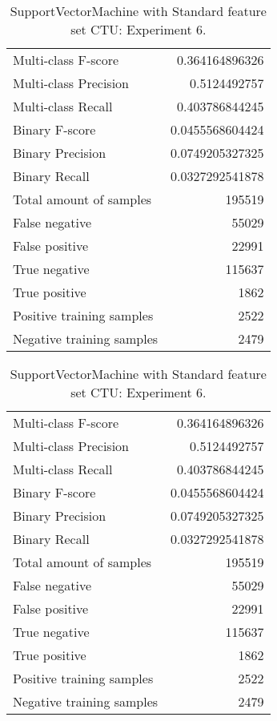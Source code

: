 \begin{table}[H]
\begin{minipage}{0.5\textwidth}
\caption{SupportVectorMachine with Standard feature set CTU: Experiment 5.}
\centering
\begin{tabular}{l r}
\toprule
Multi-class F-score & 0.364164896326 \\
Multi-class Precision & 0.5124492757 \\
Multi-class Recall & 0.403786844245 \\
\midrule
Binary F-score & 0.0455568604424 \\
Binary Precision & 0.0749205327325 \\
Binary Recall & 0.0327292541878 \\
\midrule
Total amount of samples & 195519 \\
False negative & 55029 \\
False positive & 22991 \\
True negative & 115637 \\
True positive & 1862 \\
\midrule
Positive training samples & 2522 \\
Negative training samples & 2479 \\
\bottomrule
\end{tabular}
\end{minipage}
\hfillx
\begin{minipage}{0.5\textwidth}
\caption{SupportVectorMachine with Standard feature set CTU: Experiment 6.}
\centering
\begin{tabular}{l r}
\toprule
Multi-class F-score & 0.364164896326 \\
Multi-class Precision & 0.5124492757 \\
Multi-class Recall & 0.403786844245 \\
\midrule
Binary F-score & 0.0455568604424 \\
Binary Precision & 0.0749205327325 \\
Binary Recall & 0.0327292541878 \\
\midrule
Total amount of samples & 195519 \\
False negative & 55029 \\
False positive & 22991 \\
True negative & 115637 \\
True positive & 1862 \\
\midrule
Positive training samples & 2522 \\
Negative training samples & 2479 \\
\bottomrule
\end{tabular}
\end{minipage}
\end{table}
